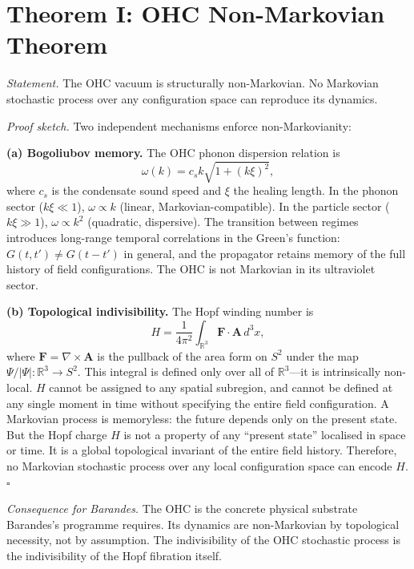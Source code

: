 \documentclass[aps,prl,preprint,superscriptaddress,floatfix]{revtex4-2}
\begin{document}
\section{Theorem I: OHC Non-Markovian Theorem}

\textit{Statement.} The OHC vacuum is structurally non-Markovian. No Markovian
stochastic process over any configuration space can reproduce its dynamics.

\textit{Proof sketch.} Two independent mechanisms enforce non-Markovianity:

\textbf{(a) Bogoliubov memory.} The OHC phonon dispersion relation is
\begin{equation}
\omega(k) = c_s k\sqrt{1 + (k\xi)^2},
\end{equation}
where $c_s$ is the condensate sound speed and $\xi$ the healing length. In
the phonon sector ($k\xi\ll 1$), $\omega\propto k$ (linear, Markovian-compatible).
In the particle sector ($k\xi\gg 1$), $\omega\propto k^2$ (quadratic,
dispersive). The transition between regimes introduces long-range temporal
correlations in the Green's function: $G(t,t')\neq G(t-t')$ in general, and
the propagator retains memory of the full history of field configurations.
The OHC is not Markovian in its ultraviolet sector.

\textbf{(b) Topological indivisibility.} The Hopf winding number is
\begin{equation}
H = \frac{1}{4\pi^2}\int_{\mathbb{R}^3} \mathbf{F}\cdot\mathbf{A}\,d^3x,
\end{equation}
where $\mathbf{F}=\nabla\times\mathbf{A}$ is the pullback of the area form on
$S^2$ under the map $\Psi/|\Psi|:\mathbb{R}^3\to S^2$. This integral is
defined only over all of $\mathbb{R}^3$---it is intrinsically non-local.
$H$ cannot be assigned to any spatial subregion, and cannot be defined at any
single moment in time without specifying the entire field configuration.
A Markovian process is memoryless: the future depends only on the present state.
But the Hopf charge $H$ is not a property of any ``present state'' localised
in space or time. It is a global topological invariant of the entire field
history. Therefore, no Markovian stochastic process over any local configuration
space can encode $H$. $\square$

\textit{Consequence for Barandes.} The OHC is the concrete physical substrate
Barandes's programme requires. Its dynamics are non-Markovian by topological
necessity, not by assumption. The indivisibility of the OHC stochastic process
is the indivisibility of the Hopf fibration itself.
\end{document}
